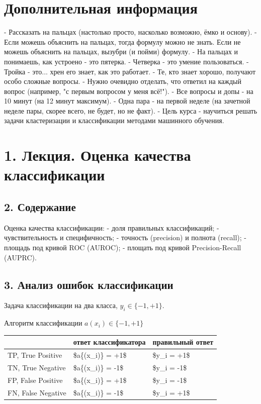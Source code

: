 \section{Дополнительная информация}

- Рассказать на пальцах (настолько просто, насколько возможно, ёмко и основу).
- Если можешь объяснить на пальцах, тогда формулу можно не знать. Если не можешь объяснить на пальцах, вызубри (и пойми) формулу.
- На пальцах и понимаешь, как устроено - это пятерка.
- Четверка - это умение пользоваться.
- Тройка - это... хрен его знает, как это работает.
- Те, кто знает хорошо, получают особо сложные вопросы.
- Нужно очевидно отделать, что ответил на каждый вопрос (например, "с первым вопросом у меня всё!").
- Все вопросы и допы - на 10 минут (на 12 минут максимум).
- Одна пара - на первой неделе (на зачетной неделе пары, скорее всего, не будет, но не факт).
- Цель курса - научиться решать задачи кластеризации и классификации методами машинного обучения.

\section{1. Лекция. Оценка качества классификации}

\subsection{2. Содержание}

Оценка качества классификации:
- доля правильных классификаций;
- чувствительность и специфичность;
- точность (precision) и полнота (recall);
- площадь под кривой ROC (AUROC);
- площать под кривой Precision-Recall (AUPRC).

\subsection{3. Анализ ошибок классификации}

Задача классификации на два класса, $y_i \in {\lbrace -1, +1 \rbrace}$.

Алгоритм классификации $a{(x_i)} \in {\lbrace -1, +1 \rbrace}$

\begin{table}[!h]
    \centering
    \begin{tabular}{|l|l|l|}
    \hline
        ~ & ответ классификатора & правильный ответ \\ \hline
        TP, True Positive & \$a\{(x\_i)\} = +1\$ & \$y\_i = +1\$ \\ \hline
        TN, True Negative & \$a\{(x\_i)\} = -1\$ & \$y\_i = -1\$ \\ \hline
        FP, False Positive & \$a\{(x\_i)\} = +1\$ & \$y\_i = -1\$ \\ \hline
        FN, False Negative & \$a\{(x\_i)\} = -1\$ & \$y\_i = +1\$ \\ \hline
    \end{tabular}
\end{table}

